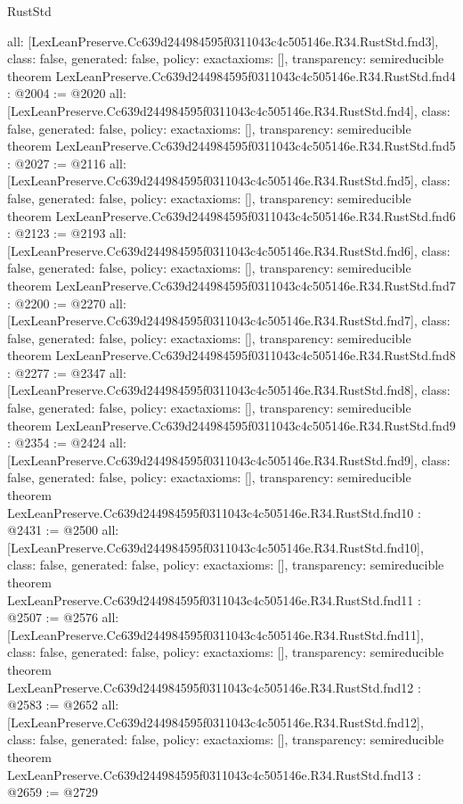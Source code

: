 \begin{lexlean}{RustStd}
\begin{coremodule}
{  all: [LexLeanPreserve.Cc639d244984595f0311043c4c505146e.R34.RustStd.fnd3],
  class: false,
  generated: false,
  policy: exact{axioms: []},
  transparency: semireducible
}
theorem LexLeanPreserve.Cc639d244984595f0311043c4c505146e.R34.RustStd.fnd4 : @2004 := @2020 {
  all: [LexLeanPreserve.Cc639d244984595f0311043c4c505146e.R34.RustStd.fnd4],
  class: false,
  generated: false,
  policy: exact{axioms: []},
  transparency: semireducible
}
theorem LexLeanPreserve.Cc639d244984595f0311043c4c505146e.R34.RustStd.fnd5 : @2027 := @2116 {
  all: [LexLeanPreserve.Cc639d244984595f0311043c4c505146e.R34.RustStd.fnd5],
  class: false,
  generated: false,
  policy: exact{axioms: []},
  transparency: semireducible
}
theorem LexLeanPreserve.Cc639d244984595f0311043c4c505146e.R34.RustStd.fnd6 : @2123 := @2193 {
  all: [LexLeanPreserve.Cc639d244984595f0311043c4c505146e.R34.RustStd.fnd6],
  class: false,
  generated: false,
  policy: exact{axioms: []},
  transparency: semireducible
}
theorem LexLeanPreserve.Cc639d244984595f0311043c4c505146e.R34.RustStd.fnd7 : @2200 := @2270 {
  all: [LexLeanPreserve.Cc639d244984595f0311043c4c505146e.R34.RustStd.fnd7],
  class: false,
  generated: false,
  policy: exact{axioms: []},
  transparency: semireducible
}
theorem LexLeanPreserve.Cc639d244984595f0311043c4c505146e.R34.RustStd.fnd8 : @2277 := @2347 {
  all: [LexLeanPreserve.Cc639d244984595f0311043c4c505146e.R34.RustStd.fnd8],
  class: false,
  generated: false,
  policy: exact{axioms: []},
  transparency: semireducible
}
theorem LexLeanPreserve.Cc639d244984595f0311043c4c505146e.R34.RustStd.fnd9 : @2354 := @2424 {
  all: [LexLeanPreserve.Cc639d244984595f0311043c4c505146e.R34.RustStd.fnd9],
  class: false,
  generated: false,
  policy: exact{axioms: []},
  transparency: semireducible
}
theorem LexLeanPreserve.Cc639d244984595f0311043c4c505146e.R34.RustStd.fnd10 : @2431 := @2500 {
  all: [LexLeanPreserve.Cc639d244984595f0311043c4c505146e.R34.RustStd.fnd10],
  class: false,
  generated: false,
  policy: exact{axioms: []},
  transparency: semireducible
}
theorem LexLeanPreserve.Cc639d244984595f0311043c4c505146e.R34.RustStd.fnd11 : @2507 := @2576 {
  all: [LexLeanPreserve.Cc639d244984595f0311043c4c505146e.R34.RustStd.fnd11],
  class: false,
  generated: false,
  policy: exact{axioms: []},
  transparency: semireducible
}
theorem LexLeanPreserve.Cc639d244984595f0311043c4c505146e.R34.RustStd.fnd12 : @2583 := @2652 {
  all: [LexLeanPreserve.Cc639d244984595f0311043c4c505146e.R34.RustStd.fnd12],
  class: false,
  generated: false,
  policy: exact{axioms: []},
  transparency: semireducible
}
theorem LexLeanPreserve.Cc639d244984595f0311043c4c505146e.R34.RustStd.fnd13 : @2659 := @2729 {
}
\end{coremodule}
\end{lexlean}
